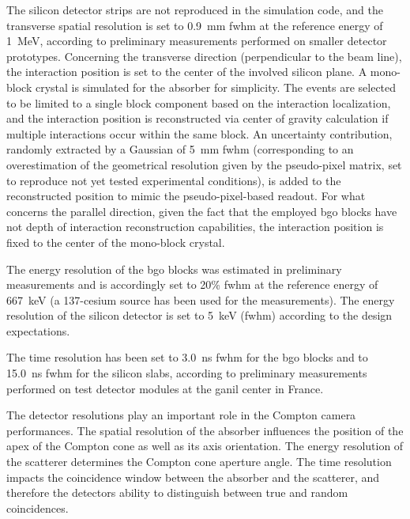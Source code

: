 The silicon detector strips are not reproduced in the simulation code, and the transverse spatial resolution is set to 0.9~mm \gls{fwhm} at the reference energy of 1~MeV, according to preliminary measurements performed on smaller detector prototypes. Concerning the transverse direction (perpendicular to the beam line), the interaction position is set to the center of the involved silicon plane. A mono-block crystal is simulated for the absorber for simplicity. The events are selected to be limited to a single block component based on the interaction localization, and the interaction position is reconstructed via center of gravity calculation if multiple interactions occur within the same block. An uncertainty contribution, randomly extracted by a Gaussian of 5~mm \gls{fwhm} (corresponding to an overestimation of the geometrical resolution given by the pseudo-pixel matrix, set to reproduce not yet tested experimental conditions), is added to the reconstructed position to mimic the pseudo-pixel-based readout. For what concerns the parallel direction, given the fact that the employed \gls{bgo} blocks have not depth of interaction reconstruction capabilities, the interaction position is fixed to the center of the mono-block crystal.

The energy resolution of the \gls{bgo} blocks was estimated in preliminary measurements and is accordingly set to 20\% \gls{fwhm} at the reference energy of 667~keV (a 137-cesium source has been used for the measurements). The energy resolution of the silicon detector is set to 5~keV (\gls{fwhm}) according to the design expectations.

The time resolution has been set to 3.0~ns \gls{fwhm} for the \gls{bgo} blocks and to 15.0~ns \gls{fwhm} for the silicon slabs, according to preliminary measurements performed on test detector modules at the \gls{ganil} %
center in France.

The detector resolutions play an important role in the Compton camera performances. The spatial resolution of the absorber influences the position of the apex of the Compton cone as well as its axis orientation. The energy resolution of the scatterer determines the Compton cone aperture angle. The time resolution impacts the coincidence window between the absorber and the scatterer, and therefore the detectors ability to distinguish between true and random coincidences.

